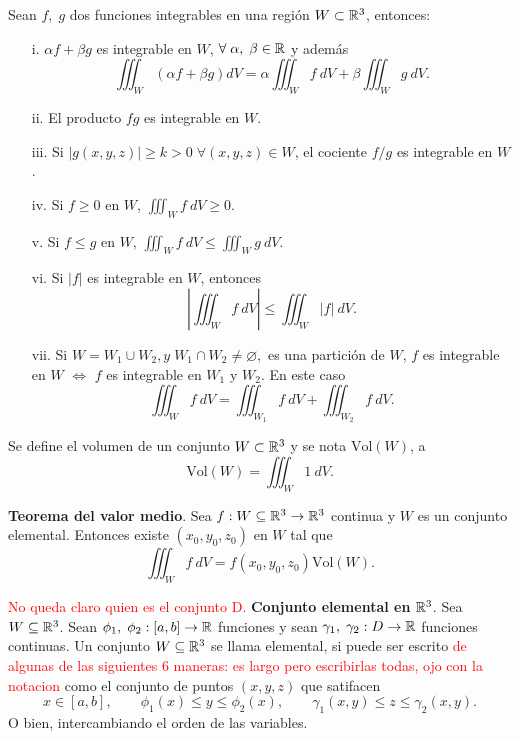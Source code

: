 \begin{propertie}
    Sean $f,\;g$ dos funciones integrables en una regi\'on $W\subset\mathbb{R}^3$, entonces:
    \begin{enumerate}
        \item[i.] $\alpha f+\beta g$ es integrable en $W$, $\forall\;\alpha,\;\beta\in\mathbb{R}$ y adem\'as
        \[
            \iiint_W \left(\alpha f+\beta g\right)dV=\alpha\iiint_W f\:dV+\beta\iiint_W g\:dV.
        \]
        \item[ii.] El producto $fg$ es integrable en $W$.
        \item[iii.] Si $|g(x,y,z)|\geq k>0\;\forall(x,y,z)\in W$, el cociente $f/g$ es integrable en $W$.
        \item[iv.] Si $f\geq 0 $ en $W$, $\iiint_W f\:dV\geq0$.
        \item[v.]Si $f\leq g$ en $W$, $\iiint_W f\:dV\leq\iiint_W g\:dV.$
        \item[vi.]Si $|f|$ es integrable en $W$, entonces 
        \[
            \left|\iiint_W f\:dV\right|\leq\iiint_W|f|\:dV.  
        \]    
        \item[vii.] Si $W=W_1\cup W_2, y \;W_1\cap W_2\neq\varnothing,$ es una partici\'on de $W$, $f$ es integrable en $W$ $\iff$ $f$ es integrable en $W_1$ y $W_2$. En este caso 
        \[
            \iiint_W f\:dV=\iiint_{W_1} f\:dV+\iiint_{W_2}f\:dV.    
        \]
    \end{enumerate}
\end{propertie}

\begin{definition}
    Se define el volumen de un conjunto $W\subset\mathbb{R}^3$  y se nota $\text{Vol}(W)$, a
    \[
        \text{Vol}(W)=\iiint_W1\:dV.
    \]
\end{definition}

\begin{theorem}
    \textbf{Teorema del valor medio}. Sea $f:W\subseteq\mathbb{R}^3\to\mathbb{R}^3$ continua y $W$ es un conjunto elemental. Entonces existe $(x_0,y_0,z_0)$ en $W$ tal que 
    \[
        \iiint_W f\:dV=f(x_0,y_0,z_0)\text{Vol}(W).
    \]
\end{theorem}

\begin{definition}  \textcolor{red}{No queda claro quien es el conjunto D.  }
    \textbf{Conjunto elemental en }$\mathbb{R}^3$.
    Sea $W\subseteq\mathbb{R}^3$. Sean $\phi_1,\;\phi_2:[a,b]\to\mathbb{R}$ funciones y sean $\gamma_1,\;\gamma_2:D\to\mathbb{R}$ funciones continuas.  Un conjunto $W\subseteq\mathbb{R}^3$ se llama elemental, si puede ser escrito  \textcolor{red}{de algunas de las siguientes 6 maneras: es largo pero escribirlas todas, ojo con la notacion} como el conjunto de puntos $(x,y,z)$ que satifacen
    \begin{equation*}
        x\in[a,b], \qquad \phi_1(x)\leq y\leq\phi_2(x), \qquad \gamma_1(x,y)\leq z\leq\gamma_2(x,y). 
    \end{equation*}
    O bien, intercambiando el orden de las variables.
\end{definition}


